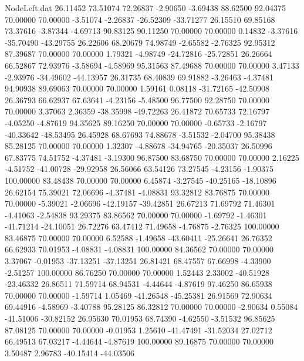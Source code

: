 \begin{filecontents}{NodeLeft.dat}
  26.11452   73.51074   72.26837    -2.90650   -3.69438   88.62500   92.04375   70.00000   70.00000   -3.51074   -2.26837  -26.52309  -33.71277
  26.15510   69.85168   73.37616    -3.87344   -4.69713   90.83125   90.11250   70.00000   70.00000    0.14832   -3.37616  -35.70490  -43.29755
  26.22606   68.20679   74.98749    -2.65582   -2.76325   92.95312   87.39687   70.00000   70.00000    1.79321   -4.98749  -24.72816  -25.72851
  26.26664   66.52867   72.93976    -3.58694   -4.58969   95.31563   87.49688   70.00000   70.00000    3.47133   -2.93976  -34.49602  -44.13957
  26.31735   68.40839   69.91882    -3.26463   -4.37481   94.90938   89.69063   70.00000   70.00000    1.59161    0.08118  -31.72165  -42.50908
  26.36793   66.62937   67.63641    -4.23156   -5.48500   96.77500   92.28750   70.00000   70.00000    3.37063    2.36359  -38.35998  -49.72263
  26.41872   70.65733   72.16797    -4.05250   -4.87619   94.35625   89.16250   70.00000   70.00000   -0.65733   -2.16797  -40.33642  -48.53495
  26.45928   68.67693   74.88678    -3.51532   -2.04700   95.38438   85.28125   70.00000   70.00000    1.32307   -4.88678  -34.94765  -20.35037
  26.50996   67.83775   74.51752    -4.37481   -3.19300   96.87500   83.68750   70.00000   70.00000    2.16225   -4.51752  -41.00728  -29.92958
  26.56066   63.54126   73.27545    -4.23156   -1.90375  100.00000   83.48438   70.00000   70.00000    6.45874   -3.27545  -40.25165  -18.10896
  26.62154   75.39021   72.06696    -4.37481   -4.08831   93.32812   83.76875   70.00000   70.00000   -5.39021   -2.06696  -42.19157  -39.42851
  26.67213   71.69792   71.46301    -4.41063   -2.54838   93.29375   83.86562   70.00000   70.00000   -1.69792   -1.46301  -41.71214  -24.10051
  26.72276   63.47412   71.49658    -4.76875   -2.76325  100.00000   83.46875   70.00000   70.00000    6.52588   -1.49658  -43.60411  -25.26641
  26.76352   66.62933   70.01953    -4.08831   -4.08831  100.00000   84.36562   70.00000   70.00000    3.37067   -0.01953  -37.13251  -37.13251
  26.81421   68.47557   67.66998    -4.33900   -2.51257  100.00000   86.76250   70.00000   70.00000    1.52443    2.33002  -40.51928  -23.46332
  26.86511   71.59714   68.94531    -4.44644   -4.87619   97.46250   86.65938   70.00000   70.00000   -1.59714    1.05469  -41.26548  -45.25381
  26.91569   72.90634   69.44916    -4.58969   -3.40788   95.28125   86.32812   70.00000   70.00000   -2.90634    0.55084  -41.51006  -30.82152
  26.95630   70.01953   68.74390    -4.62550   -3.51532   96.85625   87.08125   70.00000   70.00000   -0.01953    1.25610  -41.47491  -31.52034
  27.02712   66.49513   67.03217    -4.44644   -4.87619  100.00000   89.16875   70.00000   70.00000    3.50487    2.96783  -40.15414  -44.03506

\end{filecontents}
